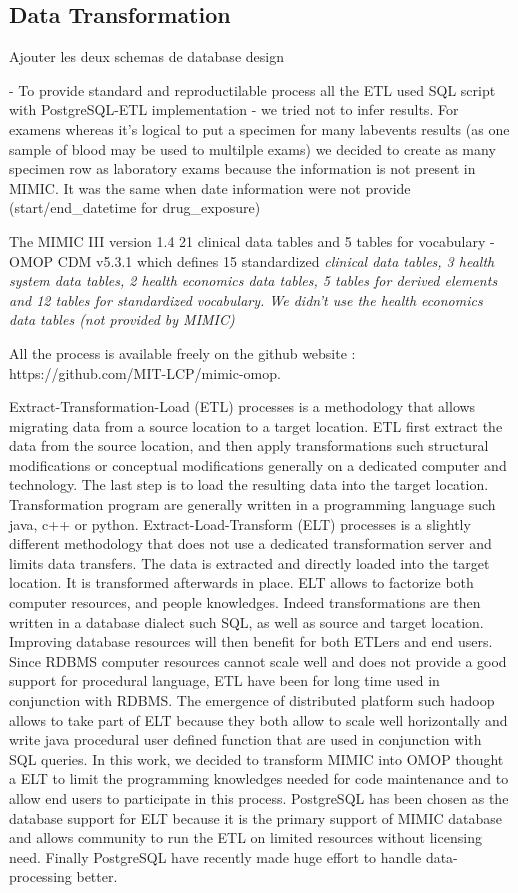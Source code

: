 \subsection{Data Transformation}

Ajouter les deux schemas de database design

- To provide standard and reproductilable process all the ETL used SQL script
  with PostgreSQL-ETL implementation
- we tried  not to infer results. For examens whereas it's logical to put a
  specimen for many labevents results (as one sample of blood may be used to
  multilple exams) we decided to create as many specimen row as laboratory
  exams because the information is not present in MIMIC. It was the same when
  date information were not provide (start/end_datetime for drug_exposure)

The MIMIC III version 1.4 21 clinical data tables and 5 tables for vocabulary
- OMOP CDM v5.3.1 which defines 15 standardized \it{clinical} data tables, 3
\it{health} system data tables, 2 \it{health economics} data tables, 5 tables
for \it{derived} elements and 12 tables for standardized \it{vocabulary}. 
We didn’t use the health economics data tables (not provided by MIMIC)

All the process is available freely on the github website :
https://github.com/MIT-LCP/mimic-omop.

Extract-Transformation-Load (ETL) processes is a methodology that allows
migrating data from a source location to a target location. ETL first extract
the data from the source location, and then apply transformations such
structural modifications or conceptual modifications generally on a dedicated
computer and technology. The last step is to load the resulting data into the
target location. Transformation program are generally written in a programming
language such java, c++ or python.
Extract-Load-Transform (ELT) processes is a slightly different methodology that
does not use a dedicated transformation server and limits data transfers. The
data is extracted and directly loaded into the target location. It is
transformed afterwards in place. ELT allows to factorize both computer
resources, and people knowledges. Indeed transformations are then written in a
database dialect such SQL, as well as source and target location. Improving
database resources will then benefit for both ETLers and end users. Since RDBMS
computer resources cannot scale well and does not provide a good support for
procedural language, ETL have been for long time used in conjunction with
RDBMS. The emergence of distributed platform such hadoop allows to take part
of ELT because they both allow to scale well horizontally and write java
procedural user defined function that are used in conjunction with SQL queries.
In this work, we decided to transform MIMIC into OMOP thought a ELT to limit
the programming knowledges needed for code maintenance and to allow end users
to participate in this process. PostgreSQL has been chosen as the database
support for ELT because it is the primary support of MIMIC database and allows
community to run the ETL on limited resources without licensing need. Finally
PostgreSQL have recently made huge effort to handle data-processing better.

